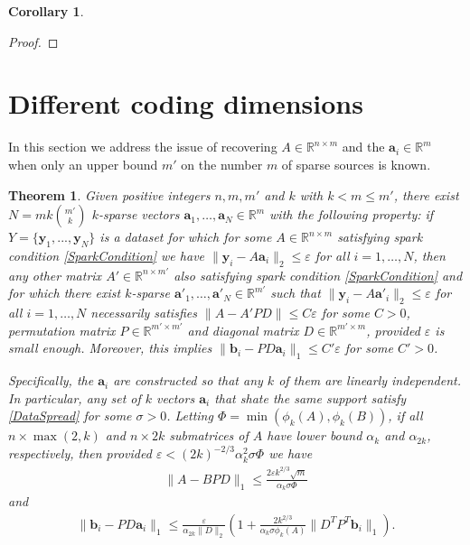 \documentclass[journal, onecolumn]{IEEEtran}
\newtheorem{theorem}{Theorem}
\newtheorem{corollary}{Corollary}
\begin{document}
\begin{corollary}

\end{corollary}

\begin{proof}

\end{proof}



\section{Different coding dimensions}\label{mleqm}

In this section we address the issue of recovering $A \in \mathbb{R}^{n \times m}$ and the $\mathbf{a}_i \in \mathbb{R}^m$ when only an upper bound $m'$ on the number $m$ of sparse sources is known.

\begin{theorem}\label{DeterministicUniquenessTheorem2}
Given positive integers $n, m, m'$ and $k$ with $k < m \leq m'$, there exist $N =  mk{m' \choose k}$ $k$-sparse vectors $\mathbf{a}_1, \ldots, \mathbf{a}_N \in \mathbb{R}^m$ with the following property: if $Y = \{ \mathbf{y}_1, ..., \mathbf{y}_N \}$ is a dataset for which for some $A \in \mathbb{R}^{n \times m}$ satisfying spark condition \eqref{SparkCondition} we have $\| \mathbf{y}_i - A\mathbf{a}_i \|_2 \leq \varepsilon$ for all $i = 1, \ldots, N$, then any other matrix $A' \in \mathbb{R}^{n \times m'}$ also satisfying spark condition \eqref{SparkCondition} and for which there exist $k$-sparse $\mathbf{a'}_1, \ldots, \mathbf{a'}_N \in \mathbb{R}^{m'}$ such that $\| \mathbf{y}_i - A\mathbf{a'}_i \|_2 \leq \varepsilon$ for all $i = 1, \ldots, N$ necessarily satisfies $\|A - A'PD\| \leq C\varepsilon$ for some $C > 0$, permutation matrix $P \in \mathbb{R}^{m' \times m'}$ and diagonal matrix $D \in \mathbb{R}^{m' \times m}$, provided $\varepsilon$ is small enough. Moreover, this implies $\|\mathbf{b}_i - PD\mathbf{a}_i\|_1 \leq C'\varepsilon$ for some $C' > 0$.

Specifically, the $\mathbf{a}_i$ are constructed so that any $k$ of them are linearly independent. In particular, any set of $k$ vectors $\mathbf{a}_i$ that shate the same support satisfy \eqref{DataSpread} for some $\sigma > 0$. Letting $\Phi = \min(\phi_k(A), \phi_k(B))$, if all $n \times \max(2,k)$ and $n \times 2k$ submatrices of $A$ have lower bound $\alpha_k$ and $\alpha_{2k}$, respectively, then provided $\varepsilon < (2k)^{-2/3}\alpha_k^2\sigma \Phi$ we have
\begin{align}
\|A - BPD\|_1 \leq \frac{2\varepsilon k^{2/3}\sqrt{m} }{\alpha_k\sigma \Phi}
\end{align}
%
and 
\begin{align}\label{b_PDa}
\|\mathbf{b}_i - PD\mathbf{a}_i\|_1 \leq \frac{\varepsilon}{\alpha_{2k}\|D\|_2}  \left( 1 + \frac{2 k^{2/3}}{\alpha_k\sigma \phi_k(A)}\|D^TP^T\mathbf{b}_i\|_1 \right).
\end{align}
\end{theorem}
\end{document}
